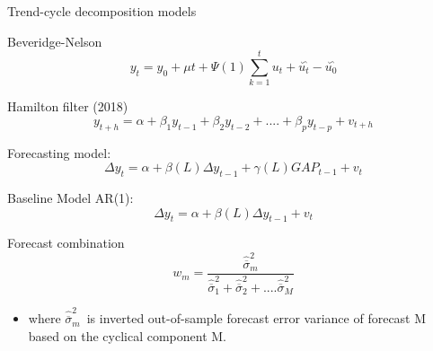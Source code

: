 \documentclass[
  ignorenonframetext,
]{beamer}
\providecommand{\tightlist}{%
  \setlength{\itemsep}{0pt}\setlength{\parskip}{0pt}}
\begin{document}
\begin{frame}{Trend-cycle decomposition models}
\protect\hypertarget{trend-cycle-decomposition-models-1}{}
\begin{block}{Beveridge-Nelson}
\protect\hypertarget{beveridge-nelson}{}
\begin{equation}
y_{t}=y_{0}+\mu t+\Psi (1)\sum_{k=1}^{t}u_{t}+\overset{\backsim }{u_{t}}-%
\overset{\backsim }{u_{0}}
\end{equation}
\end{block}

\begin{block}{Hamilton filter (2018)}
\protect\hypertarget{hamilton-filter-2018}{}
\begin{equation}
y_{t+h}=\alpha +\beta _{1}y_{t-1}+\beta _{2}y_{t-2}+....+\beta
_{p}y_{t-p}+v_{t+h}
\end{equation}
\end{block}
\end{frame}

\begin{frame}{Forecasting model:}
\protect\hypertarget{forecasting-model}{}
\begin{equation}
\Delta y_{t}=\alpha +\beta (L)\Delta y_{t-1}+\gamma (L)GAP_{t-1}+v_{t}
\end{equation}

\begin{block}{Baseline Model AR(1):}
\protect\hypertarget{baseline-model-ar1}{}
\begin{equation}
\Delta y_{t}=\alpha +\beta (L)\Delta y_{t-1}+v_{t}
\end{equation}
\end{block}

\begin{block}{Forecast combination}
\protect\hypertarget{forecast-combination}{}
\begin{equation}
w_{m}=\frac{\widehat{\overline{\sigma }}_{m}^{2}}{\widehat{\overline{\sigma }%
}_{1}^{2}+\widehat{\overline{\sigma }}_{2}^{2}+....\widehat{\overline{\sigma 
}}_{M}^{2}}
\end{equation}

\begin{itemize}
\tightlist
\item
  where \(\widehat{\overline{\sigma }}_{m}^{2}\)~is inverted
  out-of-sample forecast error variance of forecast M based on the
  cyclical component M.
\end{itemize}
\end{block}
\end{frame}
\end{document}
